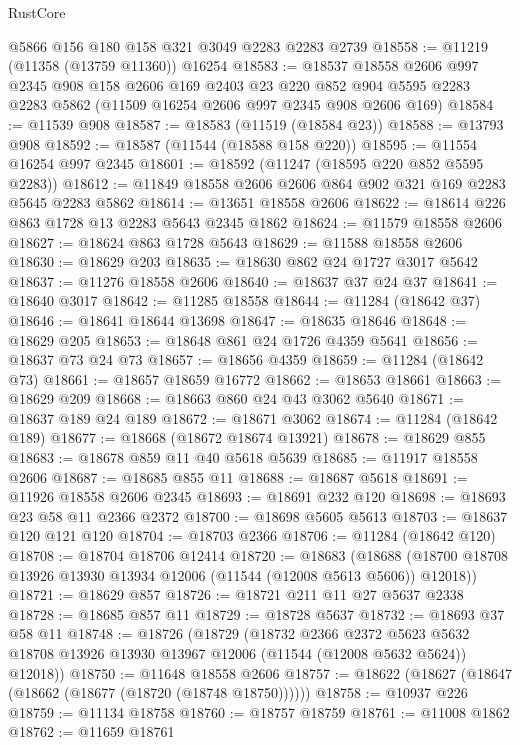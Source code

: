 \begin{lexlean}{RustCore}
\begin{coremodule}
    @5866
    @156
    @180
    @158
    @321
    @3049
    @2283
    @2283
    @2739
@18558 := @11219 (@11358 (@13759 @11360)) @16254
@18583 := @18537
    @18558
    @2606
    @997
    @2345
    @908
    @158
    @2606
    @169
    @2403
    @23
    @220
    @852
    @904
    @5595
    @2283
    @2283
    @5862
    (@11509 @16254 @2606 @997 @2345 @908 @2606 @169)
@18584 := @11539 @908
@18587 := @18583 (@11519 (@18584 @23))
@18588 := @13793 @908
@18592 := @18587 (@11544 (@18588 @158 @220))
@18595 := @11554 @16254 @997 @2345
@18601 := @18592 (@11247 (@18595 @220 @852 @5595 @2283))
@18612 := @11849 @18558 @2606 @2606 @864 @902 @321 @169 @2283 @5645 @2283 @5862
@18614 := @13651 @18558 @2606
@18622 := @18614 @226 @863 @1728 @13 @2283 @5643 @2345 @1862
@18624 := @11579 @18558 @2606
@18627 := @18624 @863 @1728 @5643
@18629 := @11588 @18558 @2606
@18630 := @18629 @203
@18635 := @18630 @862 @24 @1727 @3017 @5642
@18637 := @11276 @18558 @2606
@18640 := @18637 @37 @24 @37
@18641 := @18640 @3017
@18642 := @11285 @18558
@18644 := @11284 (@18642 @37)
@18646 := @18641 @18644 @13698
@18647 := @18635 @18646
@18648 := @18629 @205
@18653 := @18648 @861 @24 @1726 @4359 @5641
@18656 := @18637 @73 @24 @73
@18657 := @18656 @4359
@18659 := @11284 (@18642 @73)
@18661 := @18657 @18659 @16772
@18662 := @18653 @18661
@18663 := @18629 @209
@18668 := @18663 @860 @24 @43 @3062 @5640
@18671 := @18637 @189 @24 @189
@18672 := @18671 @3062
@18674 := @11284 (@18642 @189)
@18677 := @18668 (@18672 @18674 @13921)
@18678 := @18629 @855
@18683 := @18678 @859 @11 @40 @5618 @5639
@18685 := @11917 @18558 @2606
@18687 := @18685 @855 @11
@18688 := @18687 @5618
@18691 := @11926 @18558 @2606 @2345
@18693 := @18691 @232 @120
@18698 := @18693 @23 @58 @11 @2366 @2372
@18700 := @18698 @5605 @5613
@18703 := @18637 @120 @121 @120
@18704 := @18703 @2366
@18706 := @11284 (@18642 @120)
@18708 := @18704 @18706 @12414
@18720 := @18683
    (@18688 (@18700 @18708 @13926 @13930 @13934 @12006 (@11544 (@12008 @5613 @5606)) @12018))
@18721 := @18629 @857
@18726 := @18721 @211 @11 @27 @5637 @2338
@18728 := @18685 @857 @11
@18729 := @18728 @5637
@18732 := @18693 @37 @58 @11
@18748 := @18726
    (@18729
      (@18732
        @2366
        @2372
        @5623
        @5632
        @18708
        @13926
        @13930
        @13967
        @12006
        (@11544 (@12008 @5632 @5624))
        @12018))
@18750 := @11648 @18558 @2606
@18757 := @18622 (@18627 (@18647 (@18662 (@18677 (@18720 (@18748 @18750))))))
@18758 := @10937 @226
@18759 := @11134 @18758
@18760 := @18757 @18759
@18761 := @11008 @1862
@18762 := @11659 @18761

\end{coremodule}
\end{lexlean}
